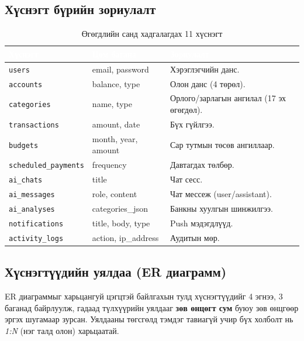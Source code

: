 \subsection{Хүснэгт бүрийн зориулалт}
\begin{table}[ht]
\centering
\footnotesize
\renewcommand{\arraystretch}{1.25}
\begin{tabular}{|l|p{3cm}|p{6.5cm}|}
\hline
\rowcolor{darknavy}
\textcolor{white}{\textbf{Хүснэгт}} & \textcolor{white}{\textbf{Цөм багана}} & \textcolor{white}{\textbf{Зориулалт}} \\ \hline
\texttt{users}        & email, password         & Хэрэглэгчийн данс. \\ \hline
\texttt{accounts}     & balance, type           & Олон данс (4 төрөл). \\ \hline
\texttt{categories}   & name, type              & Орлого/зарлагын ангилал (17 эх өгөгдөл). \\ \hline
\texttt{transactions} & amount, date            & Бүх гүйлгээ. \\ \hline
\texttt{budgets}      & month, year, amount     & Сар тутмын төсөв ангиллаар. \\ \hline
\texttt{scheduled\_payments} & frequency        & Давтагдах төлбөр. \\ \hline
\texttt{ai\_chats}    & title                   & Чат сесс. \\ \hline
\texttt{ai\_messages} & role, content          & Чат мессеж (user/assistant). \\ \hline
\texttt{ai\_analyses} & categories\_json        & Банкны хуулгын шинжилгээ. \\ \hline
\texttt{notifications} & title, body, type      & Push мэдэгдлүүд. \\ \hline
\texttt{activity\_logs} & action, ip\_address  & Аудитын мөр. \\ \hline
\end{tabular}
\caption{Өгөгдлийн санд хадгалагдах 11 хүснэгт}
\label{tab:tables}
\end{table}

\subsection{Хүснэгтүүдийн уялдаа (ER диаграмм)}
ER диаграммыг харьцангуй цэгцтэй байлгахын тулд хүснэгтүүдийг 4 эгнээ, 3 баганад байрлуулж, гадаад түлхүүрийн уялдааг \textbf{зөв өнцөгт сум} буюу зөв өнцгөөр эргэх шугамаар зурсан. Уялдааны төгсгөлд тэмдэг тавиагүй учир бүх холболт нь \textit{1:N} (нэг талд олон) харьцаатай.

